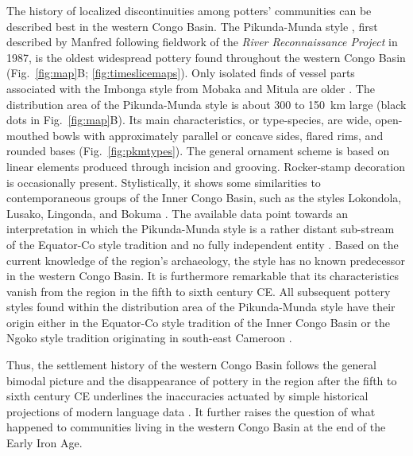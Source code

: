 \documentclass[smallextended,natbib]{svjour3}       %
\begin{document}
The history of localized discontinuities among potters' communities can be described best in the western Congo Basin. The Pikunda-Munda style \cite[114--120]{Seidensticker.2021e}, first described by Manfred \citet{Eggert.1992,Eggert.1993} following fieldwork of the \textit{River Reconnaissance Project} in 1987, is the oldest widespread pottery found throughout the western Congo Basin (Fig.~\ref{fig:map}B; \ref{fig:timeslicemaps}). Only isolated finds of vessel parts associated with the Imbonga style from Mobaka and Mitula are older \cite[Fig.~\ref{fig:map}B;][169--172]{Seidensticker.2021e}. The distribution area of the Pikunda-Munda style is about 300 to 150~km large (black dots in Fig.~\ref{fig:map}B). Its main characteristics, or type-species, are wide, open-mouthed bowls with approximately parallel or concave sides, flared rims, and rounded bases (Fig.~\ref{fig:pkmtypes}). The general ornament scheme is based on linear elements produced through incision and grooving. Rocker-stamp decoration is occasionally present. Stylistically, it shows some similarities to contemporaneous groups of the Inner Congo Basin, such as the styles Lokondola, Lusako, Lingonda, and Bokuma \citep[107]{Wotzka.1995}. The available data point towards an interpretation in which the Pikunda-Munda style is a rather distant sub-stream of the Equator-Co style tradition and no fully independent entity \citep[192]{Seidensticker.2021e}. Based on the current knowledge of the region's archaeology, the style has no known predecessor in the western Congo Basin. It is furthermore remarkable that its characteristics vanish from the region in the fifth to sixth century CE. All subsequent pottery styles found within the distribution area of the Pikunda-Munda style have their origin either in the Equator-Co style tradition of the Inner Congo Basin \citep[222--224 Fig.~4, 273]{Wotzka.1995} or the Ngoko style tradition originating in south-east Cameroon \citep[Fig.~\ref{fig:timeslicemaps};][189--192]{Seidensticker.2021e}.

Thus, the settlement history of the western Congo Basin follows the general bimodal picture \citep{Seidensticker.2016b,Seidensticker.2021e,Seidensticker.2024} and the disappearance of pottery in the region after the fifth to sixth century CE underlines the inaccuracies actuated by simple historical projections of modern language data \citep{Grollemund.2015,Bostoen.2015,Koile.2022}. It further raises the question of what happened to communities living in the western Congo Basin at the end of the Early Iron Age.
\end{document}
